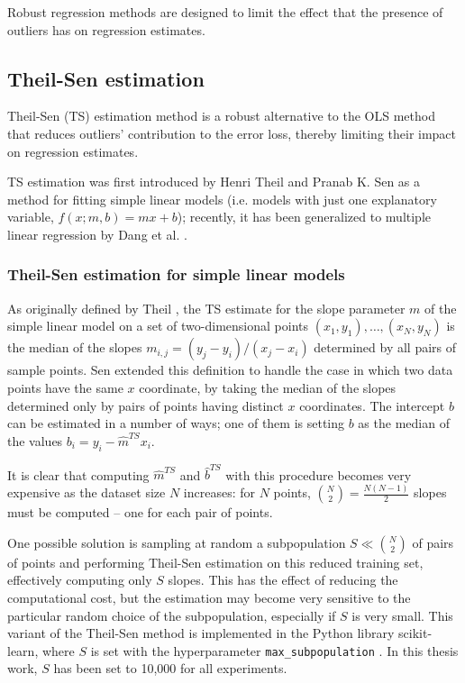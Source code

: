 Robust regression methods \cite{robust_regr} are designed to limit the effect that the presence of outliers has on regression estimates.

\subsection{Theil-Sen estimation}
\label{sec:theil-sen}
Theil-Sen (TS) estimation method is a robust alternative to the OLS method that reduces outliers' contribution to the error loss, thereby limiting their impact on regression estimates.

TS estimation was first introduced by Henri Theil \cite{theil} and Pranab K. Sen \cite{sen} as a method for fitting simple linear models (i.e. models with just one explanatory variable, $f(x;m,b)=mx+b$); recently, it has been generalized to multiple linear regression by Dang et al. \cite{multi_theil-sen}.

\subsubsection{Theil-Sen estimation for simple linear models}
As originally defined by Theil \cite{theil}, the TS estimate for the slope parameter $m$ of the simple linear model on a set of two-dimensional points $(x_1,y_1),\dots,(x_N,y_N)$ is the median of the slopes $m_{i,j} = (y_j - y_i)/(x_j - x_i)$ determined by all pairs of sample points. Sen \cite{sen} extended this definition to handle the case in which two data points have the same $x$ coordinate, by taking the median of the slopes determined only by pairs of points having distinct $x$ coordinates. The intercept $b$ can be estimated in a number of ways; one of them is setting $b$ as the median of the values $b_i = y_i - \hat{m}^{TS}x_i$.

It is clear that computing $\hat{m}^{TS}$ and $\hat{b}^{TS}$ with this procedure becomes very expensive as the dataset size $N$ increases: for $N$ points, $\binom{N}{2} = \frac{N(N-1)}{2}$ slopes must be computed -- one for each pair of points.

One possible solution is sampling at random a subpopulation $S \ll \binom{N}{2}$ of pairs of points and performing Theil-Sen estimation on this reduced training set, effectively computing only $S$ slopes. This has the effect of reducing the computational cost, but the estimation may become very sensitive to the particular random choice of the subpopulation, especially if $S$ is very small. This variant of the Theil-Sen method is implemented in the Python library scikit-learn, where $S$ is set with the hyperparameter \texttt{max\_subpopulation} \cite{sklearn_theil-sen}. In this thesis work, $S$ has been set to 10,000 for all experiments.

